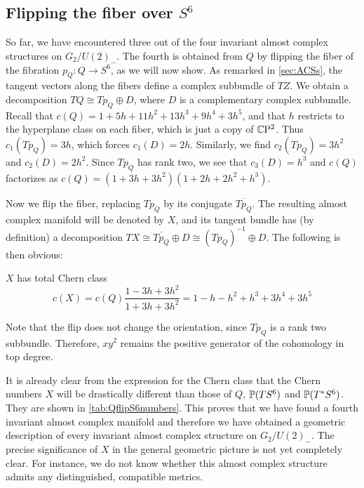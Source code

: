 \subsection{Flipping the fiber over \texorpdfstring{$S^6$}{the 6-sphere}}

So far, we have encountered three out of the four invariant almost complex structures on $G_2/U(2)_-$. The fourth is obtained from $Q$ by flipping the fiber of the fibration $p_Q:Q\to S^6$, as we will now show. As remarked in \cref{sec:ACSs}, the tangent vectors along the fibers define a complex subbundle of $TZ$. We obtain a decomposition $TQ\cong Tp_Q\oplus D$, where $D$ is a complementary complex subbundle. Recall that $c(Q)=1+5h+11h^2+13h^3+9h^4+3h^5$, and that $h$ restricts to the hyperplane class on each fiber, which is just a copy of $\CP^2$. Thus $c_1(Tp_Q)=3h$, which forces $c_1(D)=2h$. Similarly, we find $c_2(Tp_Q)=3h^2$ and $c_2(D)=2h^2$. Since $Tp_Q$ has rank two, we see that $c_3(D)=h^3$ and $c(Q)$ factorizes as $c(Q)=(1+3h+3h^2)(1+2h+2h^2+h^3)$. 

Now we flip the fiber, replacing $Tp_Q$ by its conjugate $\overline{Tp_Q}$. The resulting almost complex manifold will be denoted by $X$, and its tangent bundle has (by definition) a decomposition $TX\cong \overline{Tp_Q}\oplus D\cong (Tp_Q)^{-1}\oplus D$. The following is then obvious:

\begin{prop}
	$X$ has total Chern class 
	\begin{equation*}
		c(X)=c(Q)\frac{1-3h+3h^2}{1+3h+3h^2}
		=1-h-h^2+h^3+3h^4+3h^5
	\end{equation*}
	\proofclear
\end{prop}

Note that the flip does not change the orientation, since $Tp_Q$ is a rank two subbundle. Therefore, $xy^2$ remains the positive generator of the cohomology in top degree. 

It is already clear from the expression for the Chern class that the Chern numbers $X$ will be drastically different than those of $Q$, $\P(TS^6)$ and $\P(T^*S^6)$. They are shown in \cref{tab:QflipS6numbers}. This proves that we have found a fourth invariant almost complex manifold and therefore we have obtained a geometric description of every invariant almost complex structure on $G_2/U(2)_-$. The precise significance of $X$ in the general geometric picture is not yet completely clear. For instance, we do not know whether this almost complex structure admits any distinguished, compatible metrics.

